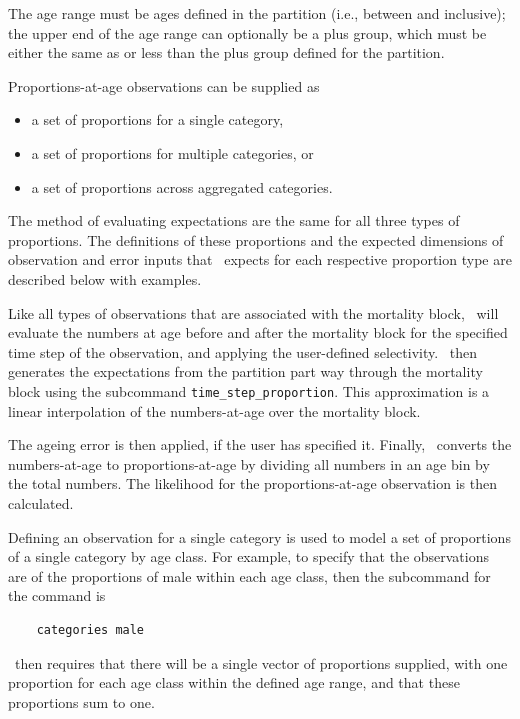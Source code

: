 The age range must be ages defined in the partition (i.e., between  and  inclusive); the upper end of the age range can optionally be a plus group, which must be either the same as or less than the plus group defined for the partition.

Proportions-at-age observations can be supplied as

\begin{itemize}
	\item a set of proportions for a single category,
	\item a set of proportions for multiple categories, or
	\item a set of proportions across aggregated categories.
\end{itemize}

The method of evaluating expectations are the same for all three types of proportions. The definitions of these proportions and the expected dimensions of observation and error inputs that \CNAME\ expects for each respective proportion type are described below with examples.

Like all types of observations that are associated with the mortality block, \CNAME\ will evaluate the numbers at age before and after the mortality block for the specified time step of the observation, and applying the user-defined selectivity. \CNAME\ then generates the expectations from the partition part way through the mortality block using the subcommand \texttt{time\_step\_proportion}. This approximation is a linear interpolation of the numbers-at-age over the mortality block.

The ageing error is then applied, if the user has specified it. Finally, \CNAME\ converts the numbers-at-age to proportions-at-age by dividing all numbers in an age bin by the total numbers. The likelihood for the proportions-at-age observation is then calculated.

Defining an observation for a single category is used to model a set of proportions of a single category by age class. For example, to specify that the observations are of the proportions of male within each age class, then the subcommand  for the  command is

{\small{\begin{verbatim}
	categories male
\end{verbatim}}}

\CNAME\ then requires that there will be a single vector of proportions supplied, with one proportion for each age class within the defined age range, and that these proportions sum to one.

